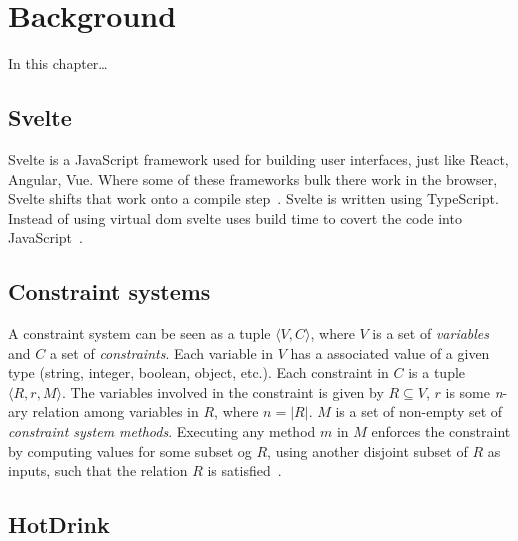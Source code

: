 \chapter{Background}
In this chapter…
\section{Svelte}
Svelte is a JavaScript framework used for building user interfaces, just like React, 
Angular, Vue. Where some of these frameworks bulk there work in the browser, Svelte 
shifts that work onto a compile step~\cite{sveltewebsite}. Svelte is written using 
TypeScript. Instead of using virtual \gls{dom} svelte uses build time to covert the 
code into JavaScript~\cite{sveltedocs}.

\section{Constraint systems}
\label{sec:constraint-systems}
A constraint system can be seen as a tuple ${\langle V, C \rangle}$, where $V$ is a set 
of \textit{variables} and $C$ a set of \textit{constraints}. Each variable in $V$ has a 
associated value of a given type (string, integer, boolean, object, etc.). Each 
constraint in $C$ is a tuple ${\langle R, r, M \rangle}$. The variables involved in the 
constraint is given by ${R \subseteq V}$, $r$ is some \textit{n}-ary relation among 
variables in $R$, where ${n = \lvert R \rvert}$. $M$ is a set of non-empty set of 
\textit{constraint system methods}. Executing any method $m$ in $M$ enforces the 
constraint by computing values for some subset og $R$, using another disjoint subset of 
$R$ as inputs, such that the relation $R$ is satisfied~\cite{AlgorithmsForUserInterfaces}. 

\section{HotDrink}
\label{sec:hotdrink}

